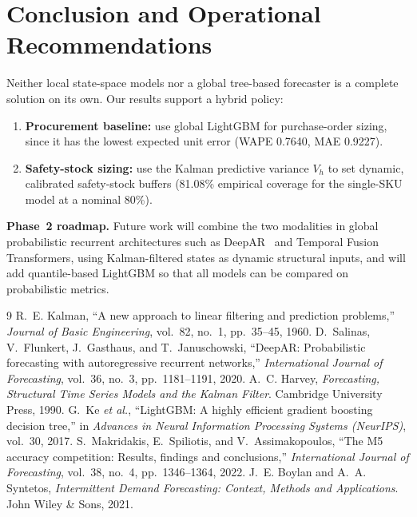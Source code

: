 \documentclass[11pt,a4paper]{article}
\begin{document}
\section{Conclusion and Operational Recommendations}
Neither local state-space models nor a global tree-based forecaster is a complete solution on its own. Our results support a hybrid policy:
\begin{enumerate}[leftmargin=2em,itemsep=2pt]
  \item \textbf{Procurement baseline:} use global LightGBM for purchase-order sizing, since it has the lowest expected unit error (WAPE 0.7640, MAE 0.9227).
  \item \textbf{Safety-stock sizing:} use the Kalman predictive variance $V_h$ to set dynamic, calibrated safety-stock buffers (81.08\% empirical coverage for the single-SKU model at a nominal 80\%).
\end{enumerate}

\textbf{Phase~2 roadmap.} Future work will combine the two modalities in global probabilistic recurrent architectures such as DeepAR~\cite{salinas2020} and Temporal Fusion Transformers, using Kalman-filtered states as dynamic structural inputs, and will add quantile-based LightGBM so that all models can be compared on probabilistic metrics.

\begin{thebibliography}{9}\small
{} R.~E. Kalman, ``A new approach to linear filtering and prediction problems,'' \emph{Journal of Basic Engineering}, vol.~82, no.~1, pp.~35--45, 1960.
 D.~Salinas, V.~Flunkert, J.~Gasthaus, and T.~Januschowski, ``DeepAR: Probabilistic forecasting with autoregressive recurrent networks,'' \emph{International Journal of Forecasting}, vol.~36, no.~3, pp.~1181--1191, 2020.
 A.~C. Harvey, \emph{Forecasting, Structural Time Series Models and the Kalman Filter}. Cambridge University Press, 1990.
 G.~Ke \emph{et al.}, ``LightGBM: A highly efficient gradient boosting decision tree,'' in \emph{Advances in Neural Information Processing Systems (NeurIPS)}, vol.~30, 2017.
 S.~Makridakis, E.~Spiliotis, and V.~Assimakopoulos, ``The M5 accuracy competition: Results, findings and conclusions,'' \emph{International Journal of Forecasting}, vol.~38, no.~4, pp.~1346--1364, 2022.
 J.~E. Boylan and A.~A. Syntetos, \emph{Intermittent Demand Forecasting: Context, Methods and Applications}. John Wiley \& Sons, 2021.
\end{thebibliography}
\end{document}
